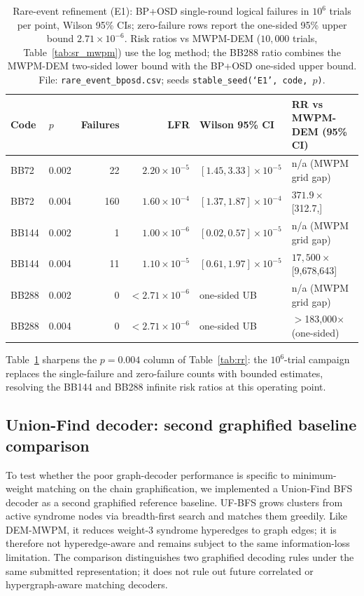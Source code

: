 \documentclass[11pt,a4paper]{article}
\begin{document}
\begin{table}[H]\centering\small
\caption{Rare-event refinement (E1): BP+OSD single-round logical failures
  in $10^{6}$ trials per point, Wilson 95\% CIs; zero-failure rows report
  the one-sided 95\% upper bound $2.71\times10^{-6}$.
  Risk ratios vs MWPM-DEM ($10{,}000$ trials, Table~\ref{tab:sr_mwpm})
  use the log method; the BB288 ratio combines the MWPM-DEM two-sided
  lower bound with the BP+OSD one-sided upper bound.
  File: \texttt{rare\_event\_bposd.csv}; seeds
  \texttt{stable\_seed(`E1',\,code,\,$p$)}.}\label{tab:e1}
\begin{tabular}{@{}llrrll@{}}
\toprule
Code & $p$ & Failures & LFR & Wilson 95\% CI & RR vs MWPM-DEM (95\% CI) \\\midrule
BB72  & 0.002 &  22 & $2.20\times10^{-5}$ & $[1.45,3.33]\times10^{-5}$ & n/a (MWPM grid gap) \\
BB72  & 0.004 & 160 & $1.60\times10^{-4}$ & $[1.37,1.87]\times10^{-4}$ & $371.9\times$ [312.7,\;442.3] \\\midrule
BB144 & 0.002 &   1 & $1.00\times10^{-6}$ & $[0.02,0.57]\times10^{-5}$\phantom{0} & n/a (MWPM grid gap) \\
BB144 & 0.004 &  11 & $1.10\times10^{-5}$ & $[0.61,1.97]\times10^{-5}$ & $17{,}500\times$ [9{,}678,\;31{,}643] \\\midrule
BB288 & 0.002 &   0 & $<2.71\times10^{-6}$ & one-sided UB & n/a (MWPM grid gap) \\
BB288 & 0.004 &   0 & $<2.71\times10^{-6}$ & one-sided UB & $>$183{,}000$\times$ (one-sided) \\
\bottomrule
\end{tabular}
\end{table}

Table~\ref{tab:e1} sharpens the $p=0.004$ column of
Table~\ref{tab:rr}: the $10^{6}$-trial campaign replaces the
single-failure and zero-failure counts with bounded estimates,
resolving the BB144 and BB288 infinite risk ratios at this operating
point.

\subsection{Union-Find decoder: second graphified baseline comparison}
\label{ssec:uf}

To test whether the poor graph-decoder performance is specific to minimum-weight
matching on the chain graphification, we implemented a Union-Find BFS decoder
as a second graphified reference baseline.
UF-BFS grows clusters from active syndrome nodes via breadth-first search and
matches them greedily.
Like DEM-MWPM, it reduces weight-3 syndrome hyperedges to graph edges; it is
therefore not hyperedge-aware and remains subject to the same information-loss
limitation.
The comparison distinguishes two graphified decoding rules under the same
submitted representation; it does not rule out future correlated or hypergraph-aware
matching decoders.
\end{document}
